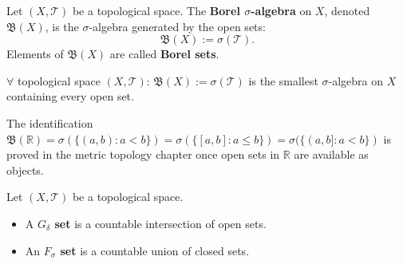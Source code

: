 
\begin{tcolorbox}[colback=propbox, colframe=propborder, arc=2pt,
  left=6pt, right=6pt, top=4pt, bottom=4pt,
  title={\small\textbf{Definition (Borel $\sigma$-Algebra)}},
  fonttitle=\small\bfseries]
\label{def:borel-sigma-algebra}
Let $(X, \mathcal{T})$ be a topological space.  The
\textbf{Borel $\sigma$-algebra} on $X$, denoted $\mathfrak{B}(X)$,
is the $\sigma$-algebra generated by the open sets:
\[
  \mathfrak{B}(X) := \sigma(\mathcal{T}).
\]
Elements of $\mathfrak{B}(X)$ are called \textbf{Borel sets}.
\end{tcolorbox}

\begin{remark*}
$\forall$ topological space $(X,\mathcal{T})$:
$\mathfrak{B}(X) := \sigma(\mathcal{T})$
is the smallest $\sigma$-algebra on $X$ containing every open set.
\end{remark*}

\begin{remark*}[Flash]
\end{remark*}

\begin{remark*}
The identification $\mathfrak{B}(\mathbb{R}) = \sigma(\{(a,b) : a<b\})
= \sigma(\{[a,b] : a\leq b\}) = \sigma(\{(a,b] : a<b\})$
is proved in the metric topology chapter once open sets in $\mathbb{R}$
are available as objects.
\end{remark*}

\begin{tcolorbox}[colback=propbox, colframe=propborder, arc=2pt,
  left=6pt, right=6pt, top=4pt, bottom=4pt,
  title={\small\textbf{Definition ($G_\delta$ and $F_\sigma$ Sets)}},
  fonttitle=\small\bfseries]
\label{def:gd-fs-sets}
Let $(X, \mathcal{T})$ be a topological space.
\begin{itemize}
  \item A \textbf{$G_\delta$ set} is a countable intersection of open sets.
  \item An \textbf{$F_\sigma$ set} is a countable union of closed sets.
\end{itemize}
\end{tcolorbox}

